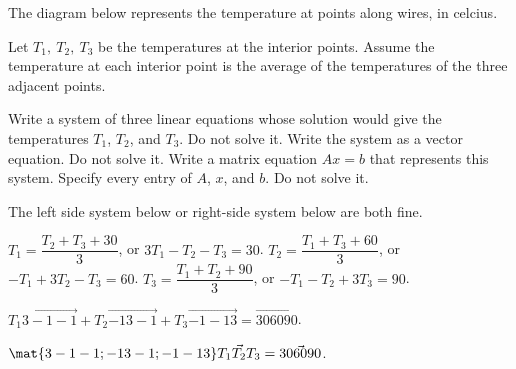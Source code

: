 \begin{problems}
\problem %
    The diagram below represents the temperature at points along
    wires, in celcius.
\begin{center}

\end{center}

Let $T_1, \ T_2, \ T_3$ be the temperatures at the interior points.
Assume the temperature at each interior point is the average of the
temperatures of the three adjacent points.
\begin{subproblems}
  \subproblem Write a system of three linear equations whose solution
  would give the temperatures $T_1$, $T_2$, and $T_3$.  Do not solve
  it.  %
  \subproblem Write the system as a vector equation. Do not
  solve it.  %
  \subproblem Write a matrix equation $Ax=b$ that represents this
  system.  Specify every entry of $A$, $x$, and $b$.  Do not solve it.
\end{subproblems}

\begin{solution}
\begin{subproblems}
  \subproblem The left side system below or right-side system below
  are both fine.

  $T_1 = \dfrac{T_2+T_3+30}{3}$, \quad or \quad
  $3T_1 - T_2 - T_3 = 30$. \newline $T_2 = \dfrac{T_1+T_3+60}{3}$,
  \quad or \quad $-T_1+3T_2-T_3 = 60$. \newline
  $T_3 = \dfrac{T_1+T_2+90}{3}$, \quad or \quad $-T_1-T_2+3T_3 = 90$.
  \newline

  \subproblem
  $T_1 \vec{3 -1 -1} + T_2 \vec{-1 3 -1} + T_3 \vec{-1 -1 3} = \vec{30
    60 90}$.  \newline

  \subproblem
  $\mat{3 -1 -1; -1 3 -1; -1 -1 3} \vec{T_1 T_2 T_3} = \vec{30 60
    90}$.
\end{subproblems}
\end{solution}

 \end{problems}\setcounter{problem}{0}
\newpage

